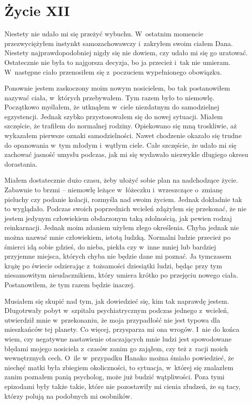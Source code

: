 \chapter{Życie XII}

Niestety nie udało mi się przeżyć wybuchu. W~ostatnim momencie przezwyciężyłem instynkt samozachowawczy i~zakryłem swoim ciałem Dana. Niestety najprawdopodobniej nigdy się nie dowiem, czy udało mi się go uratować. Ostatecznie nie była to najgorsza decyzja, bo ja przecież i~tak nie umieram. W~następne ciało przenosiłem się z~poczuciem wypełnionego obowiązku. 

Ponownie jestem zaskoczony moim nowym nosicielem, bo tak postanowiłem nazywać ciała, w~których przebywałem. Tym razem było to niemowlę. Początkowo myślałem, że utknąłem w~ciele niezdatnym do samodzielnej egzystencji. Jednak szybko przystosowałem się do nowej sytuacji. Miałem szczęście, że trafiłem do normalnej rodziny. Opiekowano się mną troskliwie, aż wykazałem pierwsze oznaki samodzielności. Nawet chodzenie okazało się trudne do opanowania w~tym młodym i~wątłym ciele. Całe szczęście, że udało mi się zachować jasność umysłu podczas, jak mi się wydawało niezwykle długiego okresu dorastania. 

Miałem dostatecznie dużo czasu, żeby ułożyć sobie plan na nadchodzące życie. Zabawnie to brzmi – niemowlę leżące w~łóżeczku i~wrzeszczące o~zmianę pieluchy czy podanie kolacji, rozmyśla nad swoim życiem. Jednak dokładnie tak to wyglądało. Podczas swoich poprzednich wcieleń zdążyłem się przekonać, że nie jestem jedynym człowiekiem obdarzonym taką zdolnością, jak pewien rodzaj reinkarnacji. Jednak moim zdaniem użyłem złego określenia. Chyba jednak nie można nazwać mnie człowiekiem, istotą ludzką. Normalni ludzie przecież po śmierci idą sobie gdzieś, do nieba, piekła czy w~inne mniej lub bardziej przyjemne miejsca, których chyba nie będzie dane mi poznać. Ja tymczasem krążę po świecie odzierając z~tożsamości dziesiątki ludzi, będąc przy tym niesamowitym nieudacznikiem, który umiera krótko po przejęciu nowego ciała. Postanowiłem, że tym razem będzie inaczej. 

Musiałem się skupić nad tym, jak dowiedzieć się, kim tak naprawdę jestem. Długotrwały pobyt w~szpitalu psychiatrycznym podczas jednego z~wcieleń, utwierdził mnie w~przekonaniu, że moja przypadłość nie jest typowa dla mieszkańców tej planety. Co więcej, przysparza mi ona wrogów. I~nie do końca wiem, czy negatywne nastawienie otaczających mnie ludzi jest spowodowane błędami mojego nosiciela z~czasów zanim go zająłem, czy też z~racji moich wewnętrznych cech. O~ile w~przypadku Hanako można śmiało powiedzieć, że niechęć matki była zbiegiem okoliczności, to sytuacja, w~której się znalazłem zanim poznałem panią psycholog, może już budzić wątpliwości. Poza tymi epizodami były także takie, które nie pozostawiły mi cienia złudzeń, że są tacy, którzy polują na podobnych mi osobników. 

